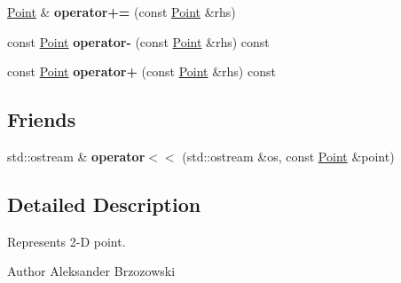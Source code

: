 \begin{DoxyCompactItemize}
\item 
\hypertarget{classPoint_a7421422b4e45c5569b9a0e981a7ab735}{\hyperlink{classPoint}{Point} \& {\bfseries operator+=} (const \hyperlink{classPoint}{Point} \&rhs)}\label{classPoint_a7421422b4e45c5569b9a0e981a7ab735}

\item 
\hypertarget{classPoint_a15d86ccf688d17948f2d16634151bd24}{const \hyperlink{classPoint}{Point} {\bfseries operator-\/} (const \hyperlink{classPoint}{Point} \&rhs) const }\label{classPoint_a15d86ccf688d17948f2d16634151bd24}

\item 
\hypertarget{classPoint_afad60ddeb82566a93079071e5802147c}{const \hyperlink{classPoint}{Point} {\bfseries operator+} (const \hyperlink{classPoint}{Point} \&rhs) const }\label{classPoint_afad60ddeb82566a93079071e5802147c}

\end{DoxyCompactItemize}
\subsection*{Friends}
\begin{DoxyCompactItemize}
\item 
\hypertarget{classPoint_a97713abf198b35c58044f2c4d04a19ea}{std\-::ostream \& {\bfseries operator$<$$<$} (std\-::ostream \&os, const \hyperlink{classPoint}{Point} \&point)}\label{classPoint_a97713abf198b35c58044f2c4d04a19ea}

\end{DoxyCompactItemize}


\subsection{Detailed Description}
Represents 2-\/\-D point. \begin{DoxyAuthor}{Author}
Aleksander Brzozowski 
\end{DoxyAuthor}



